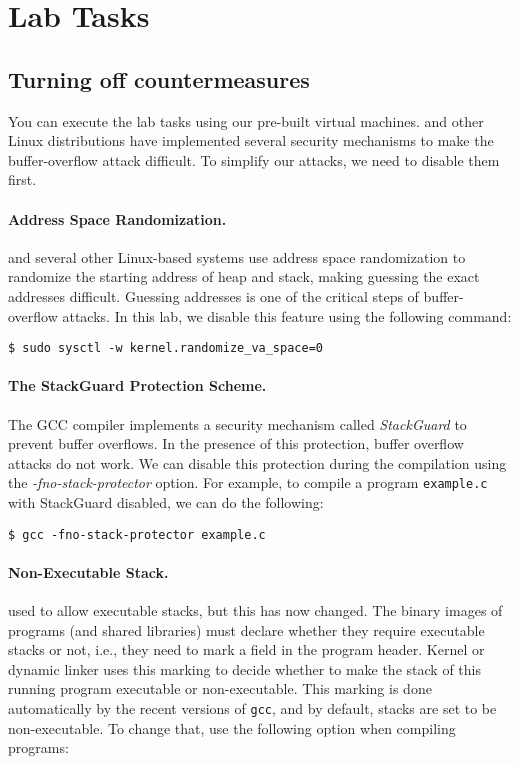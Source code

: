 \section{Lab Tasks}



\subsection{Turning off countermeasures}

You can execute the lab tasks using our pre-built \ubuntu virtual machines.
\ubuntu and other Linux distributions have implemented several
security mechanisms to make the buffer-overflow attack difficult.
To simplify our attacks, we need to disable them first.


\paragraph{Address Space Randomization.}
\ubuntu and several other Linux-based systems use address space
randomization to randomize the starting address of heap and
stack, making guessing the exact addresses difficult. Guessing
addresses is one of the critical steps of buffer-overflow attacks.  In
this lab, we disable this feature using the following command:

\begin{lstlisting}
$ sudo sysctl -w kernel.randomize_va_space=0
\end{lstlisting}




\paragraph{The StackGuard Protection Scheme.}
The GCC compiler implements a security mechanism called
\textit{StackGuard} to prevent buffer overflows. In the presence of this
protection, buffer overflow attacks do not work. We can disable this
protection during the compilation using the
\emph{-fno-stack-protector} option. For example, to compile a program
\texttt{example.c} with StackGuard disabled, we can do the following:


\begin{lstlisting}
$ gcc -fno-stack-protector example.c
\end{lstlisting}


\paragraph{Non-Executable Stack.} \ubuntu used to allow executable stacks,
but this has now changed. The binary images of programs (and shared
libraries) must declare whether they require executable stacks or not,
i.e., they need to mark a field in the program header. Kernel or dynamic
linker uses this marking to decide whether to make the stack of this
running program executable or non-executable. This marking is done
automatically by the recent versions of {\tt gcc}, and by default, 
stacks are set to be non-executable.  
To change that, use the following option when compiling programs:


